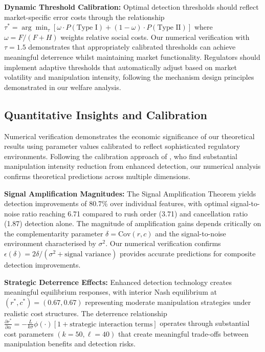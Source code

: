 \documentclass[12pt]{article}
\begin{document}
\textbf{Dynamic Threshold Calibration:} Optimal detection thresholds should reflect market-specific error costs through the relationship $\tau^* = \arg\min_\tau [\omega \cdot P(\text{Type I}) + (1-\omega) \cdot P(\text{Type II})]$ where $\omega = F/(F+H)$ weights relative social costs. Our numerical verification with $\tau = 1.5$ demonstrates that appropriately calibrated thresholds can achieve meaningful deterrence whilst maintaining market functionality. Regulators should implement adaptive thresholds that automatically adjust based on market volatility and manipulation intensity, following the mechanism design principles demonstrated in our welfare analysis.

\subsection{Quantitative Insights and Calibration}

Numerical verification demonstrates the economic significance of our theoretical results using parameter values calibrated to reflect sophisticated regulatory environments. Following the calibration approach of \citet{liu2024asset}, who find substantial manipulation intensity reduction from enhanced detection, our numerical analysis confirms theoretical predictions across multiple dimensions.

\textbf{Signal Amplification Magnitudes:} The Signal Amplification Theorem yields detection improvements of 80.7\% over individual features, with optimal signal-to-noise ratio reaching 6.71 compared to rush order (3.71) and cancellation ratio (1.87) detection alone. The magnitude of amplification gains depends critically on the complementarity parameter $\delta = \text{Cov}(r,c)$ and the signal-to-noise environment characterised by $\sigma^2$. Our numerical verification confirms $\epsilon(\delta) = 2\delta/(\sigma^2 + \text{signal variance})$ provides accurate predictions for composite detection improvements.

\textbf{Strategic Deterrence Effects:} Enhanced detection technology creates meaningful equilibrium responses, with interior Nash equilibrium at $(r^*, c^*) = (0.67, 0.67)$ representing moderate manipulation strategies under realistic cost structures. The deterrence relationship $\frac{\partial r^*}{\partial \alpha} = -\frac{L}{k\sigma} \phi(\cdot)[1 + \text{strategic interaction terms}]$ operates through substantial cost parameters $(k=50, \ell=40)$ that create meaningful trade-offs between manipulation benefits and detection risks.
\end{document}
